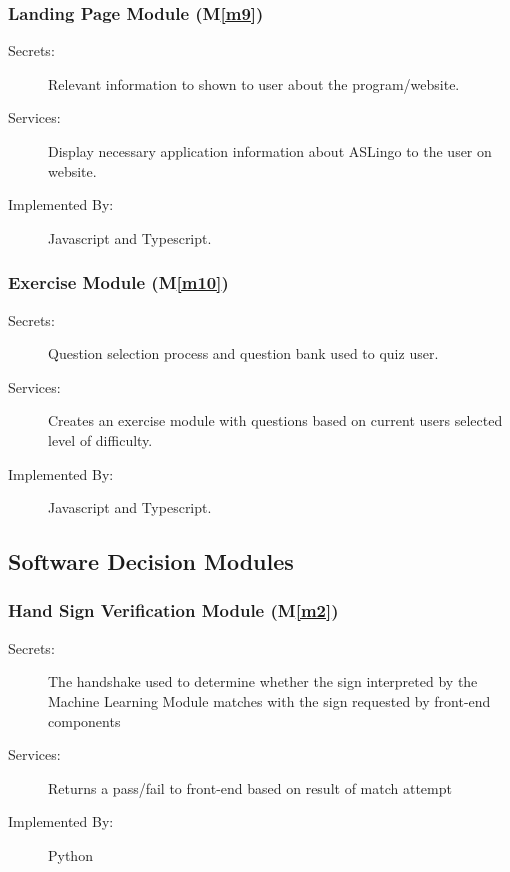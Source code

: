 \documentclass[12pt, titlepage]{article}
\newcommand{\mref}[1]{M\ref{#1}}
\begin{document}
\subsubsection{Landing Page Module (\mref{m9})}
\begin{description}
\item[Secrets:] Relevant information to shown to user about the program/website.
\item[Services:] Display necessary application information about ASLingo to the user on website.
\item[Implemented By:] Javascript and Typescript.
\end{description}

\subsubsection{Exercise Module (\mref{m10})}
\begin{description}
\item[Secrets:] Question selection process and question bank used to quiz user.
\item[Services:] Creates an exercise module with questions based on current users selected level of difficulty. 
\item[Implemented By:] Javascript and Typescript.
\end{description}

\subsection{Software Decision Modules}


\subsubsection{Hand Sign Verification Module (\mref{m2})}
\begin{description}
\item[Secrets:] The handshake used to determine whether the sign interpreted by the Machine Learning Module matches with the sign requested by front-end components
\item[Services:] Returns a pass/fail to front-end based on result of match attempt
\item[Implemented By:] Python
\end{description}
\end{document}

